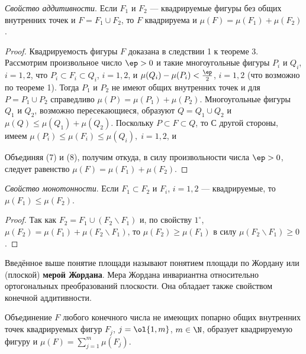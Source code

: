 \documentclass[a4paper]{article}
\begin{document}
\begin{points}{-2}

\item \emph{Свойство аддитивности}. Если $F_1$ и $F_2$ ---
квадрируемые фигуры без общих внутренних точек и $F=F_1\cup F_2$, то
$F$ квадрируема и $\mu(F)=\mu(F_1)+\mu(F_2)$.

\begin{proof}
Квадрируемость фигуры $F$ доказана в следствии 1 к теореме 3.
Рассмотрим произвольное число $\ep>0$ и такие многоугольные фигуры
$P_i$ и $Q_i$, $i=1,2$, что $P_i\subset F_i\subset Q_i$, $i=1,2$, и
$\mu(Q_i)-\mu(P_i) < \frac{\ep}2$, $i=1,2$ (что возможно по теореме
1). Тогда $P_1$ и $P_2$ не имеют общих внутренних точек и для
$P=P_1\cup P_2$ справедливо $\mu(P)=\mu(P_1)+\mu(P_2)$.
Многоугольные фигуры $Q_1$ и $Q_2$, возможно пересекающиеся,
образуют $Q=Q_1\cup Q_2$ и $\mu(Q) \le \mu(Q_1)+\mu(Q_2)$. Поскольку
$P\subset F\subset Q$, то  С другой стороны, имеем
$\mu(P_i)\le \mu(F_i) \le \mu(Q_i), \; i=1,2$, и

Объединяя (7) и (8), получим  откуда, в силу произвольности числа
$\ep>0$, следует равенство $\mu(F)=\mu(F_1)+\mu(F_2)$.
\end{proof}

\item \emph{Свойство монотонности}. Если $F_1\subset F_2$ и $F_i$,
$i=1,2$ --- квадрируемые, то $\mu(F_1) \le \mu(F_2)$.

\begin{proof}
Так как $F_2 = F_1 \cup (F_2\backslash F_1)$ и, по свойству
$1^{\circ}$, $\mu(F_2) = \mu(F_1) + \mu(F_2\backslash F_1)$, то
$\mu(F_2)\ge \mu(F_1)$ в силу $\mu(F_2\backslash F_1)\ge0$.
\end{proof}
\end{points}

Введённое выше понятие площади называют понятием площади по Жордану
или (плоской) \textbf{мерой Жордана}. Мера Жордана инвариантна
относительно ортогональных преобразований плоскости. Она обладает
также свойством конечной аддитивности.

\begin{theorem}
Объединение $F$ любого конечного числа не имеющих попарно общих
внутренних точек квадрируемых фигур $F_j$, $j=\ol{1,m}$, $m\in\N$,
образует квадрируемую фигуру и $\mu(F) = \sum\limits_{j=1}^m
\mu(F_j)$.
\end{theorem}
\end{document}
